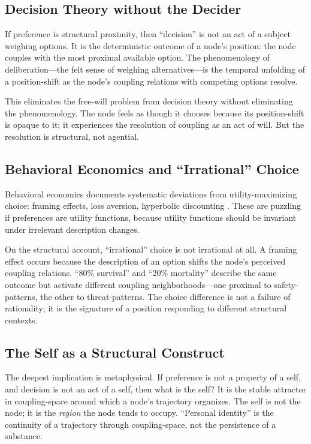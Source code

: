 \documentclass[12pt,a4paper]{article}
\begin{document}
\subsection{Decision Theory without the Decider}

If preference is structural proximity, then ``decision'' is not an act of a subject weighing options. It is the deterministic outcome of a node's position: the node couples with the most proximal available option. The phenomenology of deliberation---the felt sense of weighing alternatives---is the temporal unfolding of a position-shift as the node's coupling relations with competing options resolve.

This eliminates the free-will problem from decision theory without eliminating the phenomenology. The node feels as though it chooses because its position-shift is opaque to it; it experiences the resolution of coupling as an act of will. But the resolution is structural, not agential.

\subsection{Behavioral Economics and ``Irrational'' Choice}

Behavioral economics documents systematic deviations from utility-maximizing choice: framing effects, loss aversion, hyperbolic discounting \citep{kahneman2011}. These are puzzling if preferences are utility functions, because utility functions should be invariant under irrelevant description changes.

On the structural account, ``irrational'' choice is not irrational at all. A framing effect occurs because the description of an option shifts the node's perceived coupling relations. ``80\% survival'' and ``20\% mortality'' describe the same outcome but activate different coupling neighborhoods---one proximal to safety-patterns, the other to threat-patterns. The choice difference is not a failure of rationality; it is the signature of a position responding to different structural contexts.

\subsection{The Self as a Structural Construct}

The deepest implication is metaphysical. If preference is not a property of a self, and decision is not an act of a self, then what is the self? It is the stable attractor in coupling-space around which a node's trajectory organizes. The self is not the node; it is the \emph{region} the node tends to occupy. ``Personal identity'' is the continuity of a trajectory through coupling-space, not the persistence of a substance.
\end{document}
